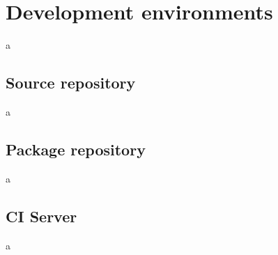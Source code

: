 \chapter{Development environments}

a

\section{Source repository}

a

\section{Package repository}

a

\section{CI Server}

a